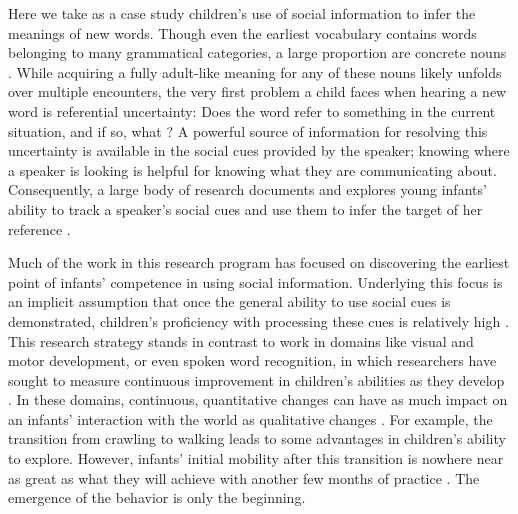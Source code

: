 \documentclass{pnastwo}
\begin{document}
\begin{article}



Here we take as a case study children's use of social information to infer the meanings of new words. Though even the earliest vocabulary contains words belonging to many grammatical categories, a large proportion are concrete nouns \citep{bates1994}. While acquiring a fully adult-like meaning for any of these nouns likely unfolds over multiple encounters, the very first problem a child faces when hearing a new word is referential uncertainty: Does the word refer to something in the current situation, and if so, what \citep{carey1978, yu2007, frank2009}? A powerful source of information for resolving this uncertainty is available in the social cues provided by the speaker; knowing where a speaker is looking is helpful for knowing what they are communicating about. Consequently, a large body of research documents and explores young infants' ability to track a speaker's social cues and use them to infer the target of her reference \citep[e.g.,][]{scaife1975, baldwin1993, hollich2000, senju2008}.

Much of the work in this research program has focused on discovering the earliest point of infants' competence in using social information. Underlying this focus is an implicit assumption that once the general ability to use social cues is demonstrated, children's proficiency with processing these cues is relatively high \citep[e.g.][]{corkum1998, brooks2005, csibra2009}. This research strategy stands in contrast to work in domains like visual and motor development, or even spoken word recognition, in which researchers have sought to measure continuous improvement in children's abilities as they develop \citep{sokol1978, banks1980, forssberg1991, thelen1995,fernald1998}. In these domains, continuous, quantitative changes can have as much impact on an infants' interaction with the world as qualitative changes \cite{adolph2015}. For example, the transition from crawling to walking leads to some advantages in children's ability to explore. However, infants' initial mobility after this transition is nowhere near as great as what they will achieve with another few months of practice \cite{adolph2012}. The emergence of the behavior is only the beginning.


\end{article}
\end{document}
